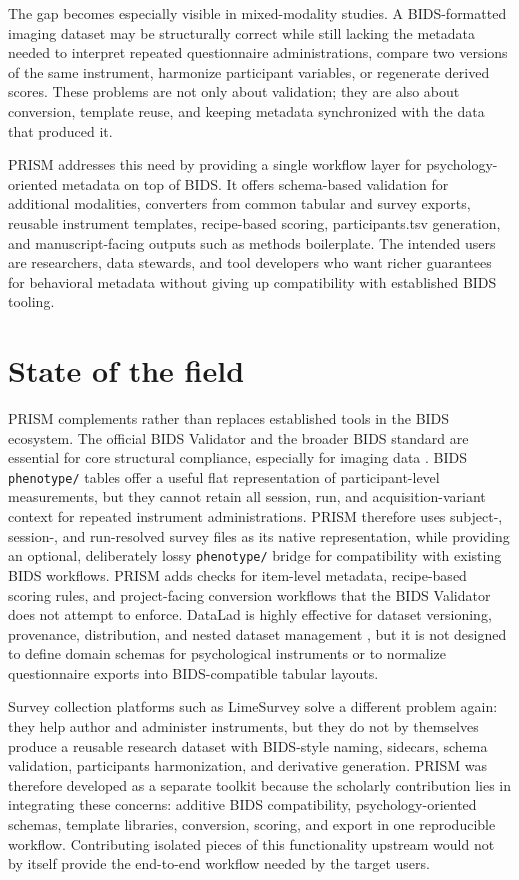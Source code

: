 \documentclass[
]{article}
\begin{document}
The gap becomes especially visible in mixed-modality studies. A
BIDS-formatted imaging dataset may be structurally correct while still
lacking the metadata needed to interpret repeated questionnaire
administrations, compare two versions of the same instrument, harmonize
participant variables, or regenerate derived scores. These problems are
not only about validation; they are also about conversion, template
reuse, and keeping metadata synchronized with the data that produced it.

PRISM addresses this need by providing a single workflow layer for
psychology-oriented metadata on top of BIDS. It offers schema-based
validation for additional modalities, converters from common tabular and
survey exports, reusable instrument templates, recipe-based scoring,
participants.tsv generation, and manuscript-facing outputs such as
methods boilerplate. The intended users are researchers, data stewards,
and tool developers who want richer guarantees for behavioral metadata
without giving up compatibility with established BIDS tooling.

\section{State of the field}\label{state-of-the-field}

PRISM complements rather than replaces established tools in the BIDS
ecosystem. The official BIDS Validator and the broader BIDS standard are
essential for core structural compliance, especially for imaging data
\citep{gorgolewski2016bids}. BIDS \texttt{phenotype/} tables offer a
useful flat representation of participant-level measurements, but they
cannot retain all session, run, and acquisition-variant context for
repeated instrument administrations. PRISM therefore uses subject-,
session-, and run-resolved survey files as its native representation,
while providing an optional, deliberately lossy \texttt{phenotype/}
bridge for compatibility with existing BIDS workflows. PRISM adds checks
for item-level metadata, recipe-based scoring rules, and project-facing
conversion workflows that the BIDS Validator does not attempt to
enforce. DataLad is highly effective for dataset versioning, provenance,
distribution, and nested dataset management
\citep{halchenko2021datalad}, but it is not designed to define domain
schemas for psychological instruments or to normalize questionnaire
exports into BIDS-compatible tabular layouts.

Survey collection platforms such as LimeSurvey solve a different problem
again: they help author and administer instruments, but they do not by
themselves produce a reusable research dataset with BIDS-style naming,
sidecars, schema validation, participants harmonization, and derivative
generation. PRISM was therefore developed as a separate toolkit because
the scholarly contribution lies in integrating these concerns: additive
BIDS compatibility, psychology-oriented schemas, template libraries,
conversion, scoring, and export in one reproducible workflow.
Contributing isolated pieces of this functionality upstream would not by
itself provide the end-to-end workflow needed by the target users.
\end{document}
